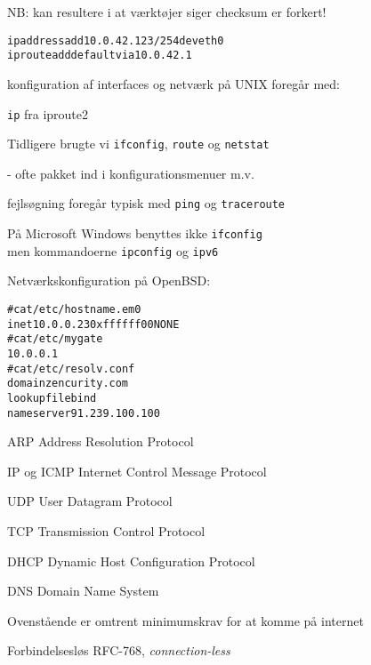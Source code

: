 \documentclass[Screen16to9,17pt]{foils}
\begin{document}
\centerline{\hlkbig NB: kan resultere i at værktøjer siger checksum er forkert!}



\begin{alltt}
ip address add 10.0.42.123/254dev eth0
ip route add default via 10.0.42.1
\end{alltt}

\begin{list1}
\item konfiguration af interfaces og netværk på UNIX foregår med:
\item \verb+ip+ fra iproute2 
\item Tidligere brugte vi \verb+ifconfig+, \verb+route+ og \verb+netstat+
\item - ofte pakket ind i konfigurationsmenuer m.v.
\item fejlsøgning foregår typisk med \verb+ping+ og \verb+traceroute+
\item På Microsoft Windows benyttes ikke \verb+ifconfig+\\
men kommandoerne \verb+ipconfig+ og \verb+ipv6+
\end{list1}



Netværkskonfiguration på OpenBSD:
\begin{alltt}
# cat /etc/hostname.em0
inet 10.0.0.23 0xffffff00 NONE
# cat /etc/mygate
10.0.0.1
# cat /etc/resolv.conf
domain zencurity.com
lookup file bind
nameserver 91.239.100.100
\end{alltt}



\begin{list1}
\item ARP Address Resolution Protocol
\item IP og ICMP Internet Control Message Protocol
\item UDP User Datagram Protocol
\item TCP Transmission Control Protocol
\item DHCP Dynamic Host Configuration Protocol
\item DNS Domain Name System
\end{list1}
\vskip 1cm
\centerline{Ovenstående er omtrent minimumskrav for at komme på internet}

\begin{list1}
\item Forbindelsesløs RFC-768, \emph{connection-less}
\end{list1}
\end{document}
